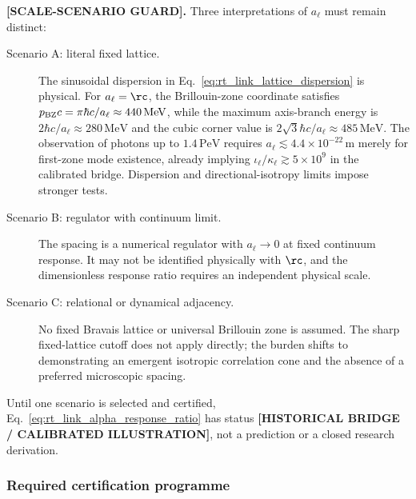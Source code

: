 \textbf{[SCALE-SCENARIO GUARD].}
Three interpretations of \(a_\ell\) must remain distinct:
\begin{description}
    \item[Scenario A: literal fixed lattice.] The sinusoidal dispersion in
    Eq.~\eqref{eq:rt_link_lattice_dispersion} is physical.  For
    \(a_\ell=\rc\), the Brillouin-zone coordinate satisfies
    \(p_{\rm BZ}c=\pi\hbar c/a_\ell\approx440\,\mathrm{MeV}\), while the
    maximum axis-branch energy is
    \(2\hbar c/a_\ell\approx280\,\mathrm{MeV}\) and the cubic corner value is
    \(2\sqrt3\hbar c/a_\ell\approx485\,\mathrm{MeV}\).  The observation of
    photons up to \(1.4\,\mathrm{PeV}\) \cite{LHAASO2021PeV} requires
    \(a_\ell\lesssim4.4\times10^{-22}\,\mathrm m\) merely for first-zone mode
    existence, already implying \(\iota_\ell/\kappa_\ell\gtrsim5\times10^9\)
    in the calibrated bridge.  Dispersion and directional-isotropy limits impose
    stronger tests.
    \item[Scenario B: regulator with continuum limit.] The spacing is a numerical
    regulator with \(a_\ell\to0\) at fixed continuum response.  It may not be
    identified physically with \(\rc\), and the dimensionless response ratio
    requires an independent physical scale.
    \item[Scenario C: relational or dynamical adjacency.] No fixed Bravais lattice
    or universal Brillouin zone is assumed.  The sharp fixed-lattice cutoff does
    not apply directly; the burden shifts to demonstrating an emergent isotropic
    correlation cone and the absence of a preferred microscopic spacing.
\end{description}
Until one scenario is selected and certified,
Eq.~\eqref{eq:rt_link_alpha_response_ratio} has status
\textbf{[HISTORICAL BRIDGE / CALIBRATED ILLUSTRATION]}, not a prediction or a
closed research derivation.

\subsubsection{Required certification programme}

